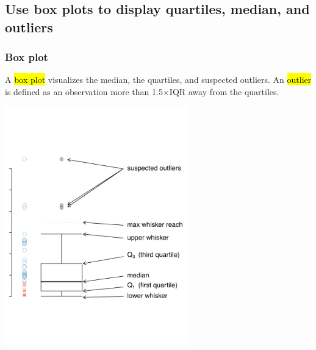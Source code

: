 \documentclass[11pt,containsverbatim,handout,xcolor=xelatex,dvipsnames,table]{beamer}
\begin{document}

\subsection{Use box plots to display quartiles, median, and outliers}
\label{mi4}


\begin{frame}
\frametitle{Box plot}

A \hl{box plot} visualizes the median, the quartiles, and suspected outliers. An \hl{outlier} is defined as an observation more than 1.5$\times$IQR away from the quartiles.

\begin{center}
\includegraphics[width=0.6\textwidth]{figures/boxPlotLayoutNumVar}
\end{center}

\end{frame}


\begin{frame}[fragile]
\frametitle{}

\vfill


\vfill

\end{frame}
\end{document}
